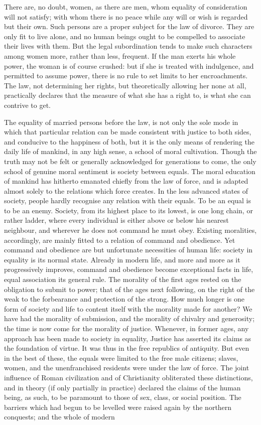 \documentclass[12pt]{report}
\begin{document}
There are, no doubt, women, as there are men, whom equality of consideration will not satisfy; with whom there is no peace while any will or wish is regarded but their own. Such persons are a proper subject for the law of divorce. They are only fit to live alone, and no human beings ought to be compelled to associate their lives with them. But the legal subordination tends to make such characters among women more, rather than less, frequent. If the man exerts his whole power, the woman is of course crushed: but if she is treated with indulgence, and permitted to assume power, there is no rule to set limits to her encroachments. The law, not determining her rights, but theoretically allowing her none at all, practically declares that the measure of what she has a right to, is what she can contrive to get.

The equality of married persons before the law, is not only the sole mode in which that particular relation can be made consistent with justice to both sides, and conducive to the happiness of both, but it is the only means of rendering the daily life of mankind, in any high sense, a school of moral cultivation. Though the truth may not be felt or generally acknowledged for generations to come, the only school of genuine moral sentiment is society between equals. The moral education of mankind has hitherto emanated chiefly from the law of force, and is adapted almost solely to the relations which force creates. In the less advanced states of society, people hardly recognise any relation with their equals. To be an equal is to be an enemy. Society, from its highest place to its lowest, is one long chain, or rather ladder, where every individual is either above or below his nearest neighbour, and wherever he does not command he must obey. Existing moralities, accordingly, are mainly fitted to a relation of command and obedience. Yet command and obedience are but unfortunate necessities of human life: society in equality is its normal state. Already in modern life, and more and more as it progressively improves, command and obedience become exceptional facts in life, equal association its general rule. The morality of the first ages rested on the obligation to submit to power; that of the ages next following, on the right of the weak to the forbearance and protection of the strong. How much longer is one form of society and life to content itself with the morality made for another? We have had the morality of submission, and the morality of chivalry and generosity; the time is now come for the morality of justice. Whenever, in former ages, any approach has been made to society in equality, Justice has asserted its claims as the foundation of virtue. It was thus in the free republics of antiquity. But even in the best of these, the equals were limited to the free male citizens; slaves, women, and the unenfranchised residents were under the law of force. The joint influence of Roman civilization and of Christianity obliterated these distinctions, and in theory (if only partially in practice) declared the claims of the human being, as such, to be paramount to those of sex, class, or social position. The barriers which had begun to be levelled were raised again by the northern conquests; and the whole of modern 
\end{document}
